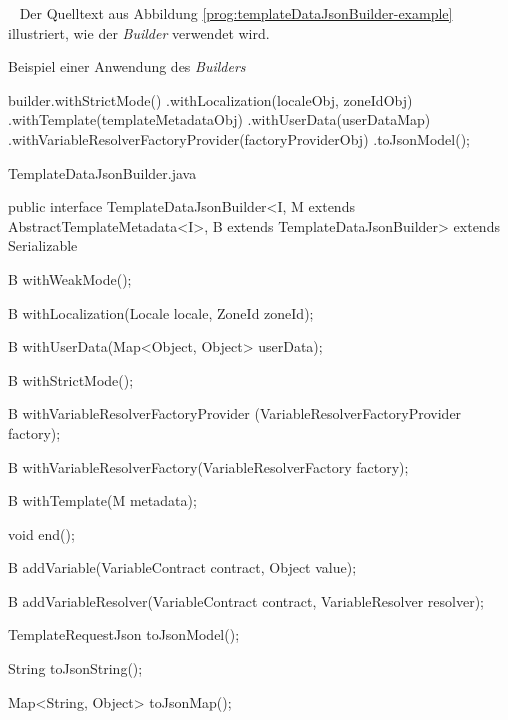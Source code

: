 \ \newline 
Der Quelltext aus Abbildung \ref{prog:templateDataJsonBuilder-example} illustriert, wie der \emph{Builder} verwendet wird.
\begin{program}[h]
\caption{Beispiel einer Anwendung des \emph{Builders}}
\label{prog:templateDataJsonBuilder-example}
\begin{JavaCode}
builder.withStrictMode() 
       .withLocalization(localeObj, zoneIdObj)
       .withTemplate(templateMetadataObj)
       .withUserData(userDataMap)
       .withVariableResolverFactoryProvider(factoryProviderObj)
       .toJsonModel();
\end{JavaCode}
\end{program}

\begin{program}[h]
\caption{TemplateDataJsonBuilder.java}
\label{prog:templateDataJsonBuilder}
\begin{JavaCode}
public interface TemplateDataJsonBuilder<I,
    M extends AbstractTemplateMetadata<I>,
    B extends TemplateDataJsonBuilder> extends Serializable {

    B withWeakMode();

    B withLocalization(Locale locale,
                       ZoneId zoneId);

    B withUserData(Map<Object, Object> userData);

    B withStrictMode();

    B withVariableResolverFactoryProvider
                         (VariableResolverFactoryProvider factory);

    B withVariableResolverFactory(VariableResolverFactory factory);

    B withTemplate(M metadata);

    void end();

    B addVariable(VariableContract contract,
                  Object value);

    B addVariableResolver(VariableContract contract,
                          VariableResolver resolver);

    TemplateRequestJson toJsonModel();

    String toJsonString();

    Map<String, Object> toJsonMap();
}
\end{JavaCode}
\end{program}
\ \newpage

